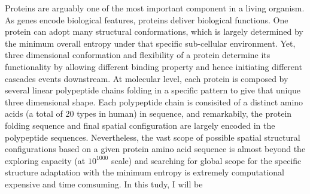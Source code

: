 Proteins are arguably one of the most important component in a living organism. As genes encode biological features, proteins deliver biological functions. One protein can adopt many structural conformations, which is largely determined by the minimum overall entropy under that specific sub-cellular environment. Yet, three dimensional conformation and flexibility of a protein determine its functionality by allowing different binding property and hence initiating different cascades events downstream. At molecular level, each protein is composed by several linear polypeptide chains folding in a specific pattern to give that unique three dimensional shape. Each polypeptide chain is consisited of a distinct amino acids (a total of 20 types in human) in sequence, and remarkabily, the protein folding sequence and final spatial configuration are largely encoded in the polypeptide sequences. Nevertheless, the vast scope of possible spatial structural configurations based on a given protein amino acid sequence is almost beyond the exploring capacity (at $10^{1000}$ scale) and searching for global scope for the specific structure adaptation with the minimum entropy is extremely computational expensive and time comsuming. In this tudy, I will be 